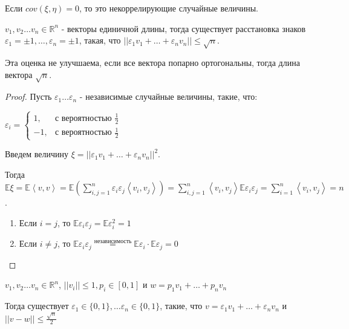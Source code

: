 \begin{definition}
    Если $cov (\xi, \eta) = 0$, то это некоррелирующие случайные величины.
\end{definition}

\begin{theorem}

    $v_1, v_2 \ldots v_n \in \mathbb{R}^n$ - векторы единичной длины, тогда
    существует расстановка знаков $\varepsilon_1 = \pm 1, \ldots, \varepsilon_n = \pm 1$,
    такая, что $||\varepsilon_1 v_1 + \ldots + \varepsilon_nv_n|| \leqslant \sqrt{n}$.

    \begin{remark}
        Эта оценка не улучшаема, если все вектора попарно ортогональны, тогда
        длина вектора $\sqrt{n}$.
    \end{remark}
\end{theorem}

\begin{proof}
    Пусть $\varepsilon_1 \ldots \varepsilon_n$ - независимые случайные величины, такие, что:

    $
    \varepsilon_{i} =
    \begin{cases}
        1, & \text{с вероятностью $\frac{1}{2}$} \\
        -1, & \text{с вероятностью $\frac{1}{2}$}
    \end{cases}
    $

    Введем величину $\xi = || \varepsilon_1 v_1 + \ldots + \varepsilon_nv_n ||^2 $.
    
    Тогда $\mathbb{E} \xi = \mathbb{E} \left < v, v \right >  =
    \mathbb{E} (\sum_{i, j = 1}^n \varepsilon_i \varepsilon_j \left < v_i, v_j \right >) =
    \sum_{i, j = 1}^n \left < v_i, v_j \right > \mathbb{E} \varepsilon_i \varepsilon_j =
    \sum_{i = 1}^n \left < v_i, v_j \right > = n$.

    \begin{enumerate}
        \item Если $i = j$, то $\mathbb{E} \varepsilon_i \varepsilon_j = \mathbb{E} \varepsilon_i^2 = 1$
        \item Если $i \neq j$, то $\mathbb{E}\varepsilon_i \varepsilon_j \overset{\text{независимость}}{=} \mathbb{E} \varepsilon_i \cdot \mathbb{E} \varepsilon_j = 0$
    \end{enumerate}
\end{proof}

\begin{theorem}

    $v_1, v_2 \ldots v_n \in \mathbb{R}^n$, $|| v_i || \leqslant 1, p_i \in [0, 1] $ и
    $w = p_1v_1 + \ldots + p_n v_n$

    Тогда существует $\varepsilon_1 \in \{ 0, 1 \}, \ldots \varepsilon_n \in \{ 0, 1 \}$,
    такие, что $v = \varepsilon_1v_1 + \ldots + \varepsilon_nv_n$ и $|| v - w || \leqslant \frac{\sqrt{n}}{2}$
\end{theorem}


